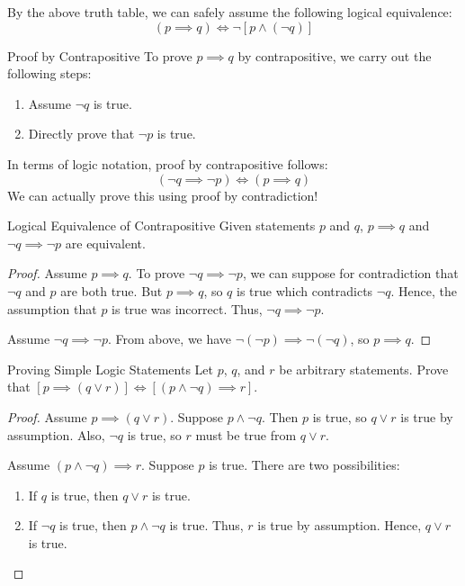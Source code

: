 \documentclass[12pt]{report}
\begin{document}
By the above truth table, we can safely assume the following logical equivalence:
\[ (p \implies q) \iff \neg \left[ p \land (\neg q) \right] \]

\begin{tecbox}{Proof by Contrapositive}{}
    To prove $p \implies q$ by contrapositive, we carry out the following steps:
    \begin{enumerate}
        \item Assume $\neg q$ is true.
        \item Directly prove that $\neg p$ is true.
    \end{enumerate}
\end{tecbox}

In terms of logic notation, proof by contrapositive follows:
\[ (\neg q \implies \neg p) \iff (p \implies q) \]
We can actually prove this using proof by contradiction!
\begin{exbox}{Logical Equivalence of Contrapositive}{}
    Given statements $p$ and $q$, $p \implies q$ and $\neg q \implies \neg p$ are equivalent.
    \tcblower
    \begin{proof}
        Assume $p \implies q$. To prove $\neg q \implies \neg p$, we can suppose for contradiction that $\neg q$ and $p$ are both true. But $p \implies q$, so $q$ is true which contradicts $\neg q$. Hence, the assumption that $p$ is true was incorrect. Thus, $\neg q \implies \neg p$.

        Assume $\neg q \implies \neg p$. From above, we have $\neg ( \neg p ) \implies \neg (\neg q)$, so $p \implies q$.
    \end{proof}
\end{exbox}

\begin{exbox}{Proving Simple Logic Statements}{}
    Let $p$, $q$, and $r$ be arbitrary statements. Prove that $\left[ p \implies (q \lor r) \right] \iff \left[ (p \land \neg q) \implies r \right]$.
    \tcblower
    \begin{proof}
        Assume $p \implies (q \lor r)$. Suppose $p \land \neg q$. Then $p$ is true, so $q \lor r$ is true by assumption. Also, $\neg q$ is true, so $r$ must be true from $q \lor r$.

        Assume $(p \land \neg q) \implies r$. Suppose $p$ is true. There are two possibilities:
        \begin{enumerate}
            \item If $q$ is true, then $q \lor r$ is true.
            \item If $\neg q$ is true, then $p \land \neg q$ is true. Thus, $r$ is true by assumption. Hence, $q \lor r$ is true.
        \end{enumerate}
    \end{proof}
\end{exbox}
\end{document}
